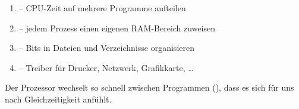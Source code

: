 \begin{frame}
\end{frame}

\begin{frame}
\begin{enumerate}[<+->]\setlength\itemsep{7pt}
  \item {} -- CPU-Zeit auf mehrere Programme aufteilen
  \item {} -- jedem Prozess einen eigenen RAM-Bereich zuweisen
  \item {} -- Bits in Dateien und Verzeichnisse organisieren
  \item {} -- Treiber für Drucker, Netzwerk, Grafikkarte, \ldots
\end{enumerate}
\end{frame}

\begin{frame}
\begin{center}

\end{center}
\begin{center}
Der Prozessor wechselt so schnell zwischen Programmen (), dass es sich für uns nach Gleichzeitigkeit anfühlt.
\end{center}
\end{frame}

\begin{frame}
\end{frame}

